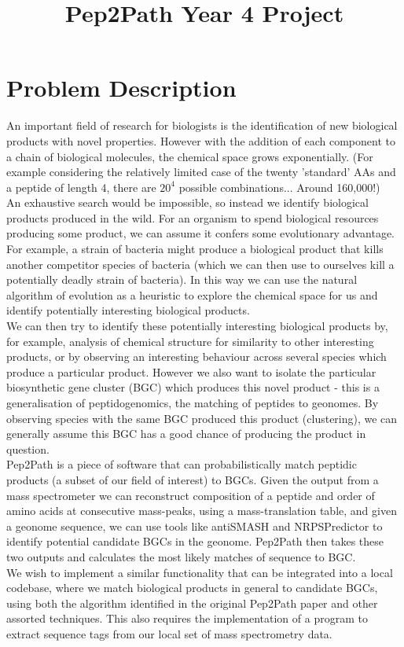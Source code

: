 \documentclass{article}
\title{Pep2Path Year 4 Project}
\begin{document}
\section*{Problem Description}

An important field of research for biologists is the identification of new biological products with novel properties.
However with the addition of each component to a chain of biological molecules, the chemical space grows exponentially.
(For example considering the relatively limited case of the twenty 'standard' AAs and a peptide of length 4, there are
\(20^4\) possible combinations... Around 160,000!) \\

An exhaustive search would be impossible, so instead we identify biological products produced in the wild.
For an organism to spend biological resources producing some product, we can assume it confers some evolutionary advantage.
For example, a strain of bacteria might produce a biological product that kills another competitor species of bacteria
(which we can then use to ourselves kill a potentially deadly strain of bacteria).
In this way we can use the natural algorithm of evolution as a heuristic to explore the chemical space for us and identify potentially
interesting biological products. \\

We can then try to identify these potentially interesting biological products by, for example, analysis of chemical structure
for similarity to other interesting products, or by observing an interesting behaviour across several species which
produce a particular product. However we also want to isolate the particular biosynthetic gene cluster (BGC) which produces
this novel product - this is a generalisation of peptidogenomics, the matching of peptides to geonomes. 
By observing species with the same BGC produced this product (clustering), we can generally assume this BGC has a good chance of 
producing the product in question. \\

Pep2Path is a piece of software that can probabilistically match peptidic products (a subset of our field of interest) to BGCs. 
Given the output from a mass spectrometer we can reconstruct composition of a peptide and order of amino acids at consecutive mass-peaks, 
using a mass-translation table, and given a geonome sequence, we can use tools like antiSMASH and NRPSPredictor to 
identify potential candidate BGCs in the geonome. Pep2Path then takes these two outputs and calculates the most likely matches of
sequence to BGC. \\

We wish to implement a similar functionality that can be integrated into a local codebase, where we match biological products in general to candidate BGCs,
using both the algorithm identified in the original Pep2Path paper and other assorted techniques. This also requires the implementation of a program to extract sequence tags from our local set of mass spectrometry data. \\
\end{document}
